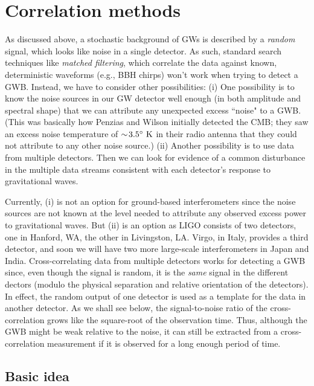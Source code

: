 \documentclass[11pt]{article}
\numberwithin{equation}{section}
\begin{document}
\section{Correlation methods}
\label{s:correlations}

As discussed above, a stochastic background of GWs 
is described by a {\em random} signal, which looks 
like noise in a single detector.
As such, standard search techniques like 
{\em matched filtering}, which correlate the data 
against known, deterministic waveforms (e.g., BBH chirps) 
won't work when trying to detect a GWB.
Instead, we have to consider other possibilities:
(i) One possibility is to know the noise sources 
in our GW detector well enough (in both 
amplitude and spectral shape) that we can 
attribute any unexpected excess ``noise" to a GWB.
(This was basically how Penzias and Wilson 
initially detected the CMB; they saw an excess 
noise temperature of $\sim\!3.5^\circ~{\rm K}$ in their
radio antenna that they could not attribute to 
any other noise source.)
(ii) Another possibility is to use data from 
multiple detectors.
Then we can look for evidence of a common 
disturbance in the multiple data streams 
consistent with each detector's response to 
gravitational waves.

Currently, (i) is not an option for ground-based 
interferometers since the noise sources are not known 
at the level needed to attribute any observed excess
power to gravitational waves.
But (ii) is an option as LIGO consists of two 
detectors, one in Hanford, WA, the other in Livingston, LA.
Virgo, in Italy, provides a third detector, 
and soon we will have two more large-scale 
interferometers in Japan and India.
Cross-correlating data from multiple detectors works
for detecting a GWB since, even though the signal is 
random, it is the {\em same} signal in the different 
dectors (modulo the physical separation and relative
orientation of the detectors).
In effect, the random output of one detector is
used as a template for the data in another detector.
As we shall see below, the signal-to-noise ratio of 
the cross-correlation grows like the square-root of 
the observation time.
Thus, although the GWB might be weak 
relative to the noise, it can still be extracted from 
a cross-correlation measurement if it is observed
for a long enough period of time.

\subsection{Basic idea}
\label{s:basic_idea}
\end{document}
